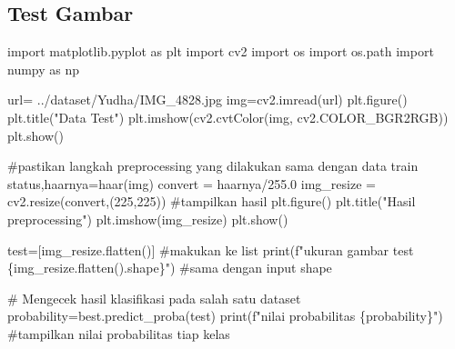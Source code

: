 \documentclass[
  letterpaper,
  DIV=11,
  numbers=noendperiod]{scrreprt}
\newenvironment{Shaded}{\begin{snugshade}}{\end{snugshade}}
\newcommand{\BuiltInTok}[1]{\textcolor[rgb]{0.00,0.23,0.31}{#1}}
\newcommand{\CommentTok}[1]{\textcolor[rgb]{0.37,0.37,0.37}{#1}}
\newcommand{\DecValTok}[1]{\textcolor[rgb]{0.68,0.00,0.00}{#1}}
\newcommand{\FloatTok}[1]{\textcolor[rgb]{0.68,0.00,0.00}{#1}}
\newcommand{\ImportTok}[1]{\textcolor[rgb]{0.00,0.46,0.62}{#1}}
\newcommand{\NormalTok}[1]{\textcolor[rgb]{0.00,0.23,0.31}{#1}}
\newcommand{\OperatorTok}[1]{\textcolor[rgb]{0.37,0.37,0.37}{#1}}
\newcommand{\SpecialCharTok}[1]{\textcolor[rgb]{0.37,0.37,0.37}{#1}}
\newcommand{\SpecialStringTok}[1]{\textcolor[rgb]{0.13,0.47,0.30}{#1}}
\newcommand{\StringTok}[1]{\textcolor[rgb]{0.13,0.47,0.30}{#1}}
\begin{document}
\hypertarget{test-gambar-1}{%
\subsection*{Test Gambar}\label{test-gambar-1}}

\begin{Shaded}
\begin{Highlighting}[]
\ImportTok{import}\NormalTok{ matplotlib.pyplot }\ImportTok{as}\NormalTok{ plt}
\ImportTok{import}\NormalTok{ cv2}
\ImportTok{import}\NormalTok{ os}
\ImportTok{import}\NormalTok{ os.path}
\ImportTok{import}\NormalTok{ numpy }\ImportTok{as}\NormalTok{ np}

\NormalTok{url}\OperatorTok{=} \StringTok{\textquotesingle{}../dataset/Yudha/IMG\_4828.jpg\textquotesingle{}}
\NormalTok{img}\OperatorTok{=}\NormalTok{cv2.imread(url)}
\NormalTok{plt.figure()}
\NormalTok{plt.title(}\StringTok{"Data Test"}\NormalTok{)}
\NormalTok{plt.imshow(cv2.cvtColor(img, cv2.COLOR\_BGR2RGB))}
\NormalTok{plt.show()}

\CommentTok{\#pastikan langkah preprocessing yang dilakukan sama dengan data train}
\NormalTok{status,haarnya}\OperatorTok{=}\NormalTok{haar(img)}
\NormalTok{convert }\OperatorTok{=}\NormalTok{ haarnya}\OperatorTok{/}\FloatTok{255.0}
\NormalTok{img\_resize }\OperatorTok{=}\NormalTok{ cv2.resize(convert,(}\DecValTok{225}\NormalTok{,}\DecValTok{225}\NormalTok{))}
\CommentTok{\#tampilkan hasil}
\NormalTok{plt.figure()}
\NormalTok{plt.title(}\StringTok{"Hasil preprocessing"}\NormalTok{)}
\NormalTok{plt.imshow(img\_resize)}
\NormalTok{plt.show()}



\NormalTok{test}\OperatorTok{=}\NormalTok{[img\_resize.flatten()] }\CommentTok{\#makukan ke list}
\BuiltInTok{print}\NormalTok{(}\SpecialStringTok{f"ukuran gambar test }\SpecialCharTok{\{}\NormalTok{img\_resize}\SpecialCharTok{.}\NormalTok{flatten()}\SpecialCharTok{.}\NormalTok{shape}\SpecialCharTok{\}}\SpecialStringTok{"}\NormalTok{) }\CommentTok{\#sama dengan input shape}

\CommentTok{\# Mengecek hasil klasifikasi pada salah satu dataset}
\NormalTok{probability}\OperatorTok{=}\NormalTok{best.predict\_proba(test)}
\BuiltInTok{print}\NormalTok{(}\SpecialStringTok{f"nilai probabilitas }\SpecialCharTok{\{}\NormalTok{probability}\SpecialCharTok{\}}\SpecialStringTok{"}\NormalTok{) }\CommentTok{\#tampilkan nilai probabilitas tiap kelas}




\end{Highlighting}
\end{Shaded}
\end{document}
